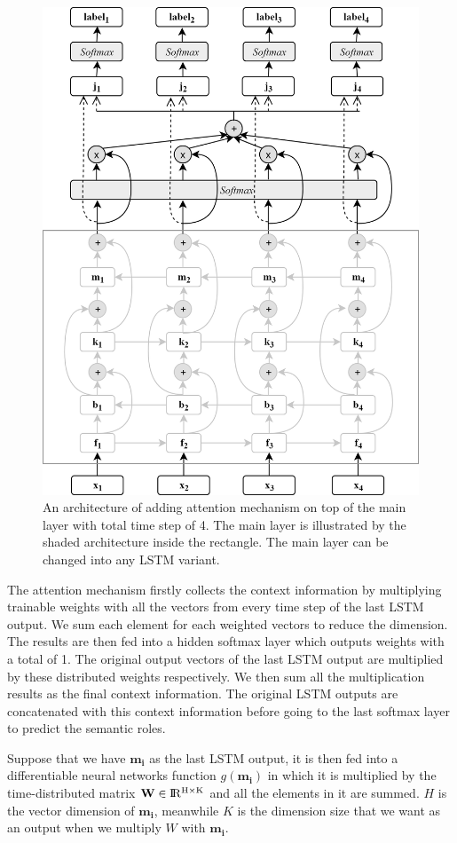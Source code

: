 \begin{figure}
	\centering
	\includegraphics[width=0.75\linewidth]{images/dblstmhighwayattention}
	\caption{An architecture of adding attention mechanism on top of the main layer with total time step of 4. The main layer is illustrated by the shaded architecture inside the rectangle. The main layer can be changed into any LSTM variant.}
	\label{fig:dblstmhighwayattention}
\end{figure}

The attention mechanism firstly collects the context information by multiplying trainable weights with all the vectors from every time step of the last LSTM output. We sum each element for each weighted vectors to reduce the dimension. The results are then fed into a hidden softmax layer which outputs weights with a total of 1. The original output vectors of the last LSTM output are multiplied by these distributed weights respectively. We then sum all the multiplication results as the final context information. The original LSTM outputs are concatenated with this context information before going to the last softmax layer to predict the semantic roles. 

Suppose that we have $\mathbf{m_{i}}$ as the last LSTM output, it is then fed into a differentiable neural networks function $g(\mathbf{m_{i}})$ in which it is multiplied by the time-distributed matrix $\textbf{W} \in {\rm I\!R^{H \times K}}$ and all the elements in it are summed. $H$ is the vector dimension of $\mathbf{m_{i}}$, meanwhile $K$ is the dimension size that we want as an output when we multiply \textbf{$W$} with $\mathbf{m_{i}}$.

